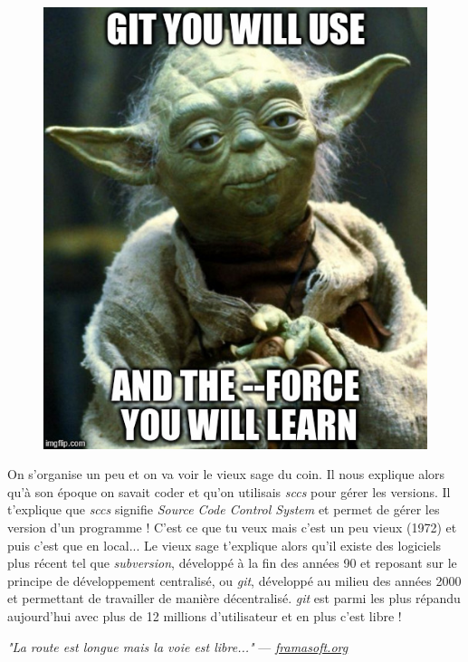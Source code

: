 \documentclass[12pt,a4paper]{article}
\begin{document}
\begin{figure}
\vspace*{-1\baselineskip}
\includegraphics[width=\linewidth]{yoda_git}
\end{figure}
On s'organise un peu et on va voir le vieux sage du coin. Il nous explique alors qu'à son époque on savait coder et qu'on utilisais \emph{sccs} pour gérer les versions. Il t'explique que \emph{sccs} signifie \emph{Source Code Control System} et permet de gérer les version d'un programme ! C'est ce que tu veux mais c'est un peu vieux (1972) et puis c'est que en local... Le vieux sage t'explique alors qu'il existe des logiciels plus récent tel que \emph{subversion}, développé à la fin des années 90 et reposant sur le principe de développement centralisé, ou \emph{git}, développé au milieu des années 2000 et permettant de travailler de manière décentralisé. \emph{git} est parmi les plus répandu aujourd'hui avec plus de 12 millions d'utilisateur et en plus c'est libre !

\emph{"La route est longue mais la voie est libre..."} --- \emph{\href{https://framasoft.org/}{framasoft.org}}
\end{document}
